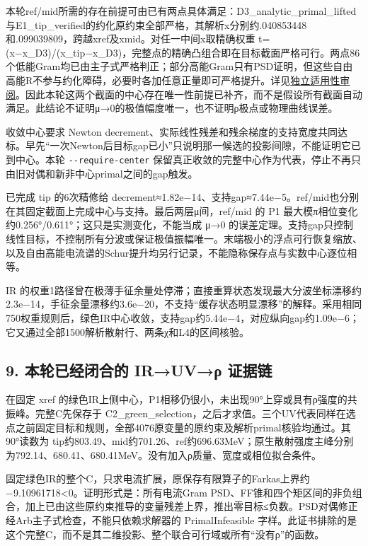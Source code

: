 \documentclass[
  10pt,
  a4paper,
]{article}
\begin{document}
本轮ref/mid所需的存在前提可由已有两点具体满足：D3\_analytic\_primal\_lifted与E1\_tip\_verified的约化原约束全部严格，其解析x分别约.040853448和.099039809，跨越xref及xmid。对任一中间x取精确权重
t=(x−x\_D3)/(x\_tip−x\_D3)，完整点的精确凸组合即在目标截面严格可行。两点86个低能Gram均已由主子式严格判正；部分高能Gram只有PSD证明，但这些自由高能R不参与约化障碍，必要时各加任意正量即可严格提升。详见\href{../../sequential_reproduction_20260910/PROOF_SCOPE_REVIEW_ZH.md}{独立适用性审阅}。因此本轮这两个截面的中心存在唯一性前提已补齐，而不是假设所有截面自动满足。此结论不证明μ→0的极值幅度唯一，也不证明ρ极点或物理曲线误差。

收敛中心要求 Newton
decrement、实际线性残差和残余梯度的支持宽度共同达标。早先``一次Newton后目标gap已小''只说明那一候选的投影间隙，不能证明它已到中心。本轮
\texttt{-\/-require-center}
保留真正收敛的完整中心作为代表，停止不再只由旧对偶和新非中心primal之间的gap触发。

已完成 tip 的6次精修给
decrement≈1.82e−14、支持gap≈7.44e−5。ref/mid也分别在其固定截面上完成中心与支持。最后两层μ间，ref/mid
的 P1 最大模π相位变化约0.256°/0.611°；这只是实测变化，不能当成 μ→0
的误差定理。支持gap只控制线性目标，不控制所有分波或保证极值振幅唯一。末端极小的浮点可行恢复缩放、以及自由高能电流谱的Schur提升均另行记录，不能隐称保存点与实数中心逐位相等。

IR
的权重1路径曾在极薄手征余量处停滞；直接重算状态发现最大分波坐标漂移约2.3e−14，手征余量漂移约3.6e−20，不支持``缓存状态明显漂移''的解释。采用相同750权重规则后，绿色IR中心收敛，支持gap约5.44e−4，对应纵向gap约1.09e−6；它又通过全部1500解析散射行、两条χ和L4的区间核验。

\subsection{9. 本轮已经闭合的 IR→UV→ρ
证据链}\label{ux672cux8f6eux5df2ux7ecfux95edux5408ux7684-iruvux3c1-ux8bc1ux636eux94fe}

在固定 xref
的绿色IR上侧中心，P1相移仍很小，未出现90°上穿或具有ρ强度的共振峰。完整C先保存于
C2\_green\_selection，之后才求值。三个UV代表同样在选点之前固定目标和规则，全部4076原变量的原约束及解析primal核验均通过。其90°读数为
tip约803.49、mid约701.26、ref约696.63MeV；原生散射强度主峰分别为792.14、680.41、680.41MeV。没有加入ρ质量、宽度或相位拟合条件。

固定绿色IR的整个C，只求电流扩展，原保存有限算子的Farkas上界约−9.10961718\textless0。证明形式是：所有电流Gram
PSD、FF锥和四个矩区间的非负组合，加上已由这些原约束推导的变量残差上界，推出零目标≤负数。PSD对偶修正经Arb主子式检查，不能只依赖求解器的
PrimalInfeasible
字样。此证书排除的是这个完整C，而不是其二维投影、整个联合可行域或所有``没有ρ''的函数。
\end{document}

